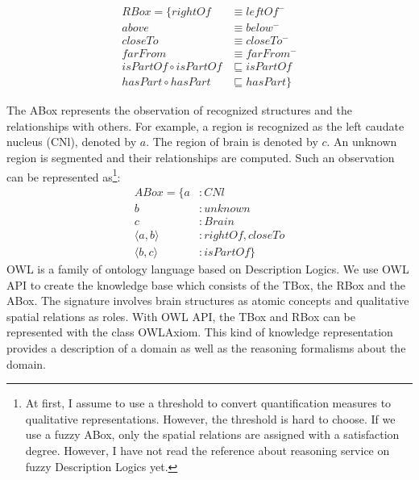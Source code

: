 \documentclass{article}
\begin{document}
\begin{align*}
 RBox=\{ rightOf &\equiv leftOf^-\\
         above &\equiv below^- \\
	 closeTo &\equiv closeTo^- \\
	 farFrom &\equiv farFrom^- \\
	 isPartOf \circ isPartOf &\sqsubseteq isPartOf \\
	 hasPart \circ hasPart &\sqsubseteq hasPart\}
\end{align*}

The ABox represents the observation of recognized structures and the relationships with others.
For example, a region is recognized as the left caudate nucleus (CNl), denoted by $a$.
The region of brain is denoted by $c$. An unknown region is segmented and their relationships are computed.  
Such an observation can be represented as\footnote{At first, I assume to use a threshold to convert quantification measures to qualitative representations. However, the threshold 
is hard to choose. If we use a fuzzy ABox, only the spatial relations are assigned with a satisfaction degree. However, I have not read the reference about reasoning service on fuzzy Description Logics yet.}:
\begin{align*}
 ABox=\{ a&: CNl \\
	 b&: unknown \\
	 c&: Brain \\
	 \langle a,b\rangle &: rightOf, closeTo \\
	 \langle b,c\rangle &: isPartOf\}
\end{align*}
OWL is a family of ontology language based on Description Logics. 
We use OWL API to create the knowledge base which consists of the TBox, the RBox and the ABox.
The signature involves brain structures as atomic concepts and qualitative spatial relations as roles.
With OWL API, the TBox  and RBox can be represented with the class OWLAxiom.
This kind of knowledge representation provides a description of a domain as well as the reasoning formalisms about the domain.
\end{document}
